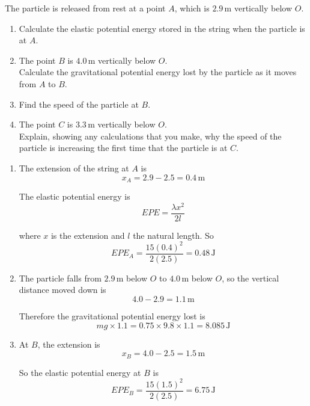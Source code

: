 \documentclass[leqno]{article}
\begin{document}
\begin{enumerate}[
  label=\textbf{\arabic*.},
  leftmargin=*,
  topsep=0pt,
  partopsep=0pt,
  parsep=0pt
]
The particle is released from rest at a point $A$, which is $2.9\,\mathrm{m}$ vertically below $O$. \\

\begin{enumerate}[label=\textbf{(\alph*)}]
  \item Calculate the elastic potential energy stored in the string when the particle is at $A$.  \\
  \item The point $B$ is $4.0\,\mathrm{m}$ vertically below $O$. \\
  Calculate the gravitational potential energy lost by the particle as it moves from $A$ to $B$.  \\
  \item Find the speed of the particle at $B$.  \\
  \item The point $C$ is $3.3\,\mathrm{m}$ vertically below $O$. \\
  Explain, showing any calculations that you make, why the speed of the particle is increasing the first time that the particle is at $C$.  \\
\end{enumerate}

\vspace*{10pt}

\begin{djsSolution}
\begin{enumerate}[label=\textbf{(\alph*)}, start=1]
  \item The extension of the string at \(A\) is
\[
 x_A=2.9-2.5=0.4\,\mathrm{m}
\]

The elastic potential energy is
\[
EPE=\frac{\lambda x^2}{2l}
\]

where \(x\) is the extension and \(l\) the natural length. So
\[
EPE_A=\frac{15(0.4)^2}{2(2.5)}=0.48\,\mathrm{J}
\]


  \item The particle falls from \(2.9\,\mathrm{m}\) below \(O\) to \(4.0\,\mathrm{m}\) below \(O\), so the vertical distance moved down is
\[
4.0-2.9=1.1\,\mathrm{m}
\]

Therefore the gravitational potential energy lost is
\[
mg\times 1.1=0.75\times 9.8\times 1.1=8.085\,\mathrm{J}
\]


  \item At \(B\), the extension is
\[
 x_B=4.0-2.5=1.5\,\mathrm{m}
\]

So the elastic potential energy at \(B\) is
\[
EPE_B=\frac{15(1.5)^2}{2(2.5)}=6.75\,\mathrm{J}
\]


\end{enumerate}
\end{djsSolution}
\end{enumerate}
\end{document}
